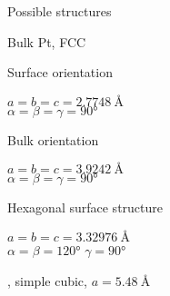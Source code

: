 \begin{frame}{Possible structures}

Bulk Pt, FCC

Surface orientation

    $a=b=c=\SI{2.7748}{\angstrom}$\\
    $\alpha=\beta=\gamma=90°$

Bulk orientation

    $a=b=c = \SI{3.9242}{\angstrom}$\\
    $\alpha=\beta=\gamma=90°$

Hexagonal surface structure

    $a=b=c = \SI{3.32976}{\angstrom}$\\

    $\alpha=\beta=120°$
    $\gamma=90°$

\ptthreeofour, simple cubic, $a = \SI{5.48}{\angstrom}$
    
\end{frame}